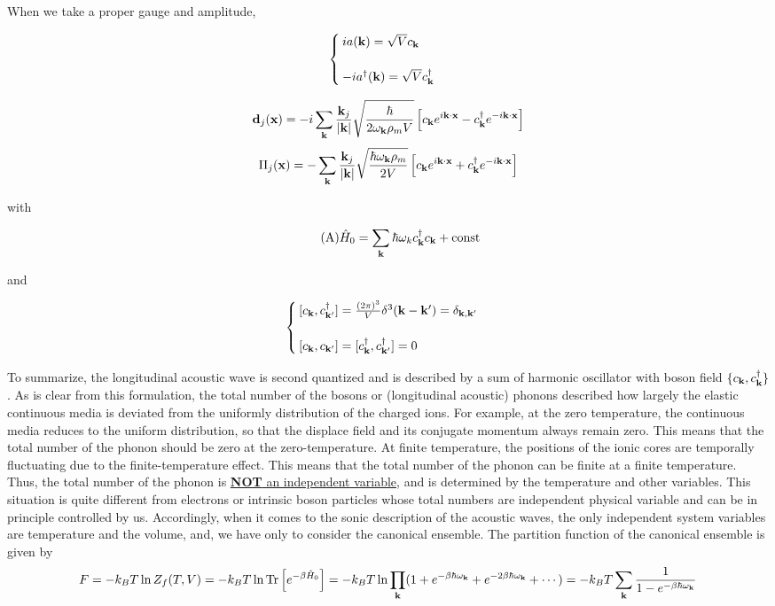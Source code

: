 When we take a proper gauge and amplitude,

\[\begin{cases}
ia({\bf k}) = \sqrt{V}c_{\bf k}\\
\ \\
-ia^\dagger({\bf k}) = \sqrt{V}c^\dagger_{\bf k}
\end{cases}\]

\[{\bf d}_j({\bf x}) = -i\sum_{\bf k}\frac{{\bf k}_j}{|{\bf k}|}\sqrt{\frac{\hbar}{2\omega_{\bf k}\rho_mV}}\left[c_{\bf k}e^{i\bf k\cdot x}-c^\dagger_{\bf k}e^{-i\bf k\cdot x}\right]\]
\[\Pi_j({\bf x}) = -\sum_{\bf k}\frac{{\bf k}_j}{|{\bf k}|}\sqrt{\frac{\hbar\omega_{\bf k}\rho_m}{2V}}\left[c_{\bf k}e^{i\bf k\cdot x}+c^\dagger_{\bf k}e^{-i\bf k\cdot x}\right]\]

with

\begin{align}\tag{A}\label{5A}
\hat{H}_0 = \sum_{\bf k}\hbar\omega_k c_{\bf k}^\dagger c_{\bf k}+\text{const}
\end{align}

and

\[\begin{cases}
[c_{\bf k},c^\dagger_{\bf k'}] = \frac{(2\pi)^3}{V}\delta^3({\bf k-k'}) = \delta_{\bf k,k'}\\
\ \\
[c_{\bf k},c_{\bf k'}] = [c^\dagger_{\bf k},c^\dagger_{\bf k'}] = 0
\end{cases}\]

To summarize, the longitudinal acoustic wave is second quantized and is described by a sum of harmonic oscillator with boson field $\{c_{\bf k},c^\dagger_{\bf k}\}$. As is clear from this formulation, the total number of the bosons or (longitudinal acoustic) phonons described how largely the elastic continuous media is deviated from the uniformly distribution of the charged ions. For example, at the zero temperature, the continuous media reduces to the uniform distribution, so that the displace field and its conjugate momentum always remain zero. This means that the total number of the phonon should be zero at the zero-temperature. At finite temperature, the positions of the ionic cores are temporally fluctuating due to the finite-temperature effect. This means that the total number of the phonon can be finite at a finite temperature. Thus, the total number of the phonon is \uline{{\bf NOT} an independent variable}, and is determined by the temperature and other variables. This situation is quite different from electrons or intrinsic boson particles whose total numbers are independent physical variable and can be in principle controlled by us. Accordingly, when it comes to the sonic description of the acoustic waves, the only independent system variables are temperature and the volume, and, we have only to consider the canonical ensemble. The partition function of the canonical ensemble is given by
\[F = -k_BT\ln Z_f(T,V) = -k_BT\ln\text{Tr}\left[e^{-\beta\hat{H}_0}\right] = -k_BT\ln\prod_{\bf k}(1+e^{-\beta\hbar\omega_{\bf k}} + e^{-2\beta\hbar\omega_{\bf k}} + \cdots) = -k_BT\sum_{\bf k}\frac{1}{1-e^{-\beta\hbar\omega_{\bf k}}} \]

